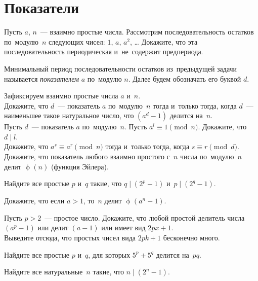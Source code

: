 
\section*{Показатели}


\begingroup
    \ifdefined\mathup
        \def\eulerphi{\mathup{\phi}}%
    \else
        \def\eulerphi{\upphi}%
    \fi
    \def\divides{\mathrel{\vert}}%

\begin{problems}

\item
Пусть $a$, $n$~--- взаимно простые числа.
Рассмотрим последовательность остатков по~модулю~$n$ следующих чисел:
$1$, $a$, $a^{2}$, \ldots
Докажите, что эта последовательность периодическая и~не~содержит предпериода.

\end{problems}

Минимальный период последовательности остатков из~предыдущей задачи называется
\emph{показателем} $a$ по~модулю $n$.
Далее будем обозначать его буквой $d$.

\begin{problems}

\item
Зафиксируем взаимно простые числа $a$ и~$n$.
\\
\subproblem
Докажите, что $d$~--- показатель $a$ по~модулю~$n$ тогда и~только тогда, когда
$d$~--- наименьшее такое натуральное число, что $(a^{d} - 1)$ делится на~$n$.
\\
\subproblem
Пусть $d$~--- показатель $a$ по~модулю~$n$.
Пусть $a^{l} \equiv 1 \pmod{n}$.
Докажите, что $d \divides l$.
\\
\subproblem
Докажите, что $a^{s} \equiv a^{r} \pmod{n}$ тогда и~только тогда, когда
$s \equiv r \pmod{d}$.
\\
\subproblem
Докажите, что показатель любого взаимно простого с~$n$ числа по~модулю~$n$
делит $\eulerphi(n)$ (функция Эйлера).

\item
Найдите все простые $p$ и~$q$ такие, что $q \divides (2^{p} - 1)$
и~$p \divides (2^{q} - 1)$.

\item
Докажите, что если $a > 1$, то~$n$ делит $\eulerphi(a^{n} - 1)$.

\item
\subproblem
Пусть $p > 2$~--- простое число.
Докажите, что любой простой делитель числа $(a^{p} - 1)$ или делит $(a - 1)$
или имеет вид $2 p x + 1$.
\\
\subproblem
Выведите отсюда, что простых чисел вида $2 p k + 1$ бесконечно много.

\item
Найдите все простые $p$ и~$q$, для которых $5^{p} + 5^{q}$ делится на~$p q$.

\item
Найдите все натуральные~$n$ такие, что $n \divides (2^{n} - 1)$.

\end{problems}

\endgroup %

